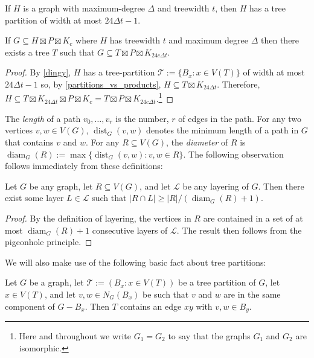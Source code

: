\documentclass{patmorin}
\newcommand{\defin}[1]{\emph{\color{brightmaroon}#1}}
\DeclareMathOperator{\dist}{dist}
\DeclareMathOperator{\diam}{diam}
\begin{document}
\begin{thm}\label{dingy}
  If $H$ is a graph with maximum-degree $\Delta$ and treewidth $t$, then $H$ has a tree partition of width at most $24\Delta t-1$.
\end{thm}

\begin{cor}
  If $G\subseteq H\boxtimes P\boxtimes K_c$ where $H$ has treewidth $t$ and maximum degree $\Delta$ then there exists a tree $T$ such that $G\subseteq T\boxtimes P\boxtimes K_{24c\Delta t}$. 
\end{cor}

\begin{proof}
  By \cref{dingy}, $H$ has a tree-partition $\mathcal{T}:=\{B_x:x\in V(T)\}$ of width at most $24\Delta t-1$ so, by \cref{partitions_vs_products}, $H \subseteq T\boxtimes K_{24\Delta t}$.  Therefore, $H\subseteq T\boxtimes K_{24\Delta t}\boxtimes P\boxtimes K_c = T\boxtimes P\boxtimes K_{24c\Delta t}$.\footnote{Here and throughout we write $G_1=G_2$ to say that the graphs $G_1$ and $G_2$ are isomorphic.}
\end{proof}


The \defin{length} of a path $v_0,\ldots,v_r$ is the number, $r$ of edges in the path. For any two vertices $v,w\in V(G)$, $\dist_G(v,w)$ denotes the minimum length of a path in $G$ that contains $v$ and $w$. For any $R\subseteq V(G)$, the \defin{diameter} of $R$ is $\diam_G(R):=\max\{\dist_G(v,w):v,w\in R\}$.  The following observation follows immediately from these definitions:

\begin{obs}\label{diameter_spread}
  Let $G$ be any graph, let $R\subseteq V(G)$, and let $\mathcal{L}$ be any layering of $G$.  Then there exist some layer $L\in\mathcal{L}$ such that $|R\cap L|\ge |R|/(\diam_G(R)+1)$.
\end{obs}

\begin{proof}
  By the definition of layering, the vertices in $R$ are contained in a set of at most $\diam_G(R)+1$ consecutive layers of $\mathcal{L}$. The result then follows from the pigeonhole principle.
\end{proof}


We will also make use of the following basic fact about tree partitions:

\begin{obs}\label{tree_thingy}
  Let $G$ be a graph, let $\mathcal{T}:=(B_x:x\in V(T))$ be a tree partition of $G$, let $x\in V(T)$, and let $v,w\in N_G(B_x)$ be such that $v$ and $w$ are in the same component of $G-B_x$.  Then $T$ contains an edge $xy$ with $v,w\in B_y$.
\end{obs}
\end{document}
